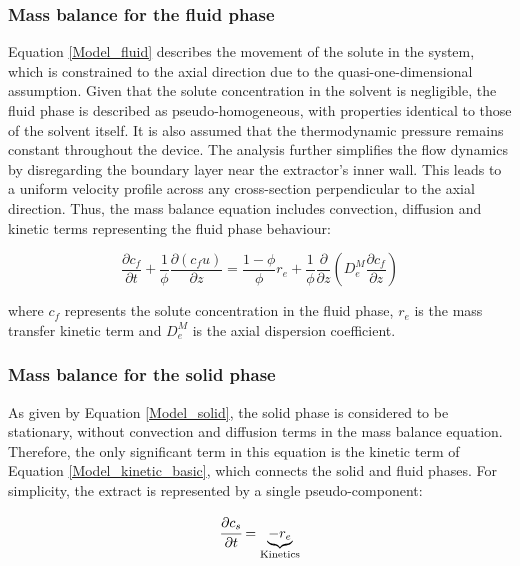 \documentclass[a4paper,fleqn]{cas-dc}
\begin{document}
\subsubsection{Mass balance for the fluid phase} \label{CH: Mass_balance_fluid}

Equation \ref{Model_fluid} describes the movement of the solute in the system, which is constrained to the axial direction due to the quasi-one-dimensional assumption. Given that the solute concentration in the solvent is negligible, the fluid phase is described as pseudo-homogeneous, with properties identical to those of the solvent itself. It is also assumed that the thermodynamic pressure remains constant throughout the device. The analysis further simplifies the flow dynamics by disregarding the boundary layer near the extractor's inner wall. This leads to a uniform velocity profile across any cross-section perpendicular to the axial direction. Thus, the mass balance equation includes convection, diffusion and kinetic terms representing the fluid phase behaviour:

{\footnotesize
	\begin{equation}
		\label{Model_fluid}
		\frac{\partial c_f}{\partial t}
		+ \frac{1}{\phi} \frac{\partial \left( c_f u\right)}{\partial z}
		= \frac{1-\phi}{\phi} r_e
		+ \frac{1}{\phi} \frac{\partial}{\partial z} \left( D^M_e \frac{\partial c_f}{\partial z} \right)
	\end{equation}
}

where $c_f$ represents the solute concentration in the fluid phase, $r_e$ is the mass transfer kinetic term and $D^M_e$ is the axial dispersion coefficient.

\subsubsection{Mass balance for the solid phase} \label{Mass_balance_solid}

As given by Equation \ref{Model_solid}, the solid phase is considered to be stationary, without convection and diffusion terms in the mass balance equation. Therefore, the only significant term in this equation is the kinetic term of Equation \ref{Model_kinetic_basic}, which connects the solid and fluid phases. For simplicity, the extract is represented by a single pseudo-component: 

{\footnotesize
	\begin{equation} 
		\label{Model_solid}
				\cfrac{\partial c_s}{\partial t} = \underbrace{ -  r_e }_{\text{Kinetics}}
		\end{equation} }
		
\end{document}
